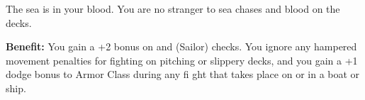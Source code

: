 
The sea is in your blood. You are no stranger to sea chases and blood on the decks.

\textbf{Benefit:} You gain a +2 bonus on  and  (Sailor) checks. You ignore any hampered movement penalties for fighting on pitching or slippery decks, and you gain a +1 dodge bonus to Armor Class during any fi ght that takes place on or in a boat or ship.